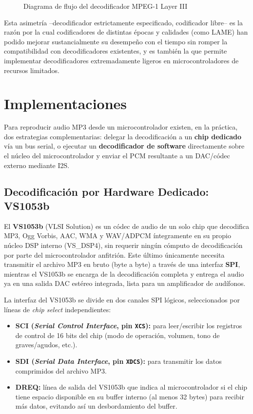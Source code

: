 \documentclass[pdflatex,sn-mathphys-num]{sn-jnl}%
\begin{document}
\begin{figure}[!h]
    \centering
    \caption{Diagrama de flujo del decodificador MPEG-1 Layer III}
    \label{fig:decoder_flow}
\end{figure}

Esta asimetría --decodificador estrictamente especificado, codificador libre-- es la razón por la cual codificadores de distintas épocas y calidades (como LAME) han podido mejorar sustancialmente su desempeño con el tiempo sin romper la compatibilidad con decodificadores existentes, y es también la que permite implementar decodificadores extremadamente ligeros en microcontroladores de recursos limitados.

\section{Implementaciones}\label{sec:implementations}
Para reproducir audio MP3 desde un microcontrolador existen, en la práctica, dos estrategias complementarias: delegar la decodificación a un \textbf{chip dedicado} vía un bus serial, o ejecutar un \textbf{decodificador de software} directamente sobre el núcleo del microcontrolador y enviar el PCM resultante a un DAC/códec externo mediante I2S.

\subsection{Decodificación por Hardware Dedicado: VS1053b}\label{sec:vs1053}
El \textbf{VS1053b} (VLSI Solution) es un códec de audio de un solo chip que decodifica MP3, Ogg Vorbis, AAC, WMA y WAV/ADPCM íntegramente en su propio núcleo DSP interno (VS\_DSP4), sin requerir ningún cómputo de decodificación por parte del microcontrolador anfitrión. Este último únicamente necesita transmitir el archivo MP3 en bruto (byte a byte) a través de una interfaz \textbf{SPI}, mientras el VS1053b se encarga de la decodificación completa y entrega el audio ya en una salida DAC estéreo integrada, lista para un amplificador de audífonos.

La interfaz del VS1053b se divide en dos canales SPI lógicos, seleccionados por líneas de \textit{chip select} independientes:
\begin{itemize}
    \item \textbf{SCI (\textit{Serial Control Interface}, pin \texttt{XCS}):} para leer/escribir los registros de control de 16 bits del chip (modo de operación, volumen, tono de graves/agudos, etc.).
    \item \textbf{SDI (\textit{Serial Data Interface}, pin \texttt{XDCS}):} para transmitir los datos comprimidos del archivo MP3.
    \item \textbf{DREQ:} línea de salida del VS1053b que indica al microcontrolador si el chip tiene espacio disponible en su buffer interno (al menos 32 bytes) para recibir más datos, evitando así un desbordamiento del buffer.
\end{itemize}
\end{document}
